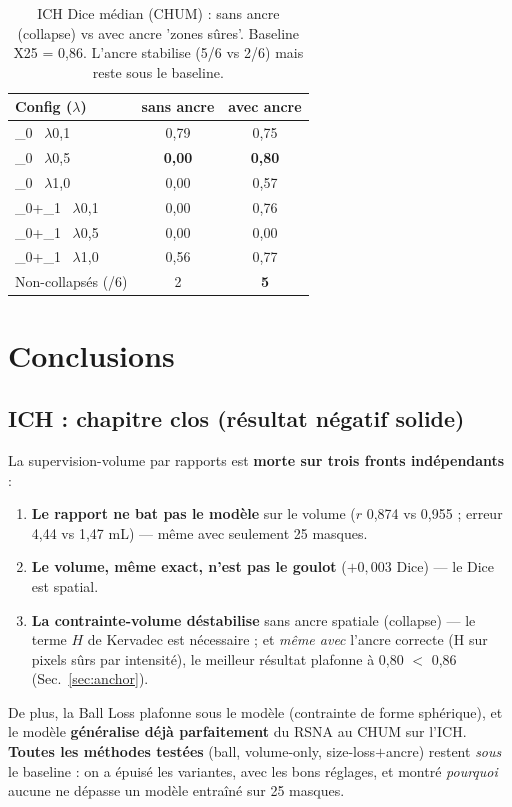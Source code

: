 \documentclass[11pt,a4paper]{article}
\begin{document}
\begin{table}[h]\centering
\caption{ICH Dice médian (CHUM) : sans ancre (collapse) vs avec ancre 'zones sûres'.
Baseline X25 = 0,86. L'ancre stabilise (5/6 vs 2/6) mais reste sous le baseline.}
\label{tab:anchor}
\begin{tabular}{lcc}
\toprule
Config ($\lambda$) & sans ancre & avec ancre \\
\midrule
\_0 \ $\lambda$0,1 & 0,79 & 0,75 \\
\_0 \ $\lambda$0,5 & \textbf{0,00} & \textbf{0,80} \\
\_0 \ $\lambda$1,0 & 0,00 & 0,57 \\
\_0+\_1 \ $\lambda$0,1 & 0,00 & 0,76 \\
\_0+\_1 \ $\lambda$0,5 & 0,00 & 0,00 \\
\_0+\_1 \ $\lambda$1,0 & 0,56 & 0,77 \\
\midrule
Non-collapsés (/6) & 2 & \textbf{5} \\
\bottomrule
\end{tabular}
\end{table}

\section{Conclusions}
\subsection{ICH : chapitre clos (résultat négatif solide)}
La supervision-volume par rapports est \textbf{morte sur trois fronts indépendants} :
\begin{enumerate}[nosep]
  \item \textbf{Le rapport ne bat pas le modèle} sur le volume ($r$ 0,874 vs 0,955 ;
  erreur 4,44 vs 1,47 mL) --- même avec seulement 25 masques.
  \item \textbf{Le volume, même exact, n'est pas le goulot} ($+0{,}003$ Dice) --- le Dice
  est spatial.
  \item \textbf{La contrainte-volume déstabilise} sans ancre spatiale (collapse) --- le terme
  $H$ de Kervadec est nécessaire ; et \emph{même avec} l'ancre correcte (H sur pixels sûrs
  par intensité), le meilleur résultat plafonne à 0,80 $<$ 0,86 (Sec.~\ref{sec:anchor}).
\end{enumerate}
De plus, la Ball Loss plafonne sous le modèle (contrainte de forme sphérique), et le modèle
\textbf{généralise déjà parfaitement} du RSNA au CHUM sur l'ICH. \textbf{Toutes les méthodes
testées} (ball, volume-only, size-loss$+$ancre) restent \emph{sous} le baseline : on a
épuisé les variantes, avec les bons réglages, et montré \emph{pourquoi} aucune ne dépasse un
modèle entraîné sur 25 masques.
\end{document}
